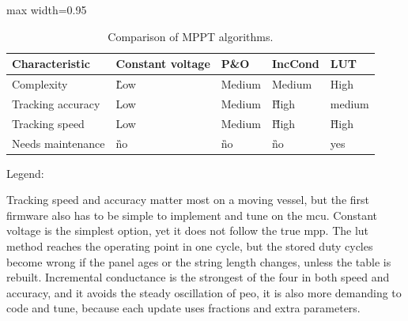         \begin{table}[htbp]
        \centering
        \caption{Comparison of MPPT algorithms.}
        \label{tab:mppt-algorithm-comparison}
        \scriptsize
        \setlength{\tabcolsep}{4pt}
        \renewcommand{\arraystretch}{1.05}
        \begin{adjustbox}{max width=0.95\textwidth}
            \begin{tabularx}{\textwidth}{>{\raggedright\arraybackslash}p{3.2cm}
                                        >{\centering\arraybackslash}X
                                        >{\centering\arraybackslash}X
                                        >{\centering\arraybackslash}X
                                        >{\centering\arraybackslash}X}
            \toprule
            \textbf{Characteristic} & \textbf{Constant voltage} & \textbf{P\&O} & \textbf{IncCond} & \textbf{LUT} \\
            \midrule
            Complexity & \G Low & \Y Medium & \Y Medium & \R High \\
            Tracking accuracy & \R Low & \Y Medium & \G High & \Y medium \\
            Tracking speed & \R Low & \Y Medium & \G High & \G High \\
            Needs maintenance & \G no & \G no & \G no & \R yes \\
            \bottomrule
            \end{tabularx}
        \end{adjustbox}
            \begin{center}
                Legend:   
            \end{center}
        \end{table}

        Tracking speed and accuracy matter most on a moving vessel, but the first firmware also has to be simple to implement and tune on the \ac{mcu}. Constant voltage is the simplest option, yet it does not follow the true \ac{mpp}. The \acs{lut} method reaches the operating point in one cycle, but the stored duty cycles become wrong if the panel ages or the string length changes, unless the table is rebuilt. Incremental conductance is the strongest of the four in both speed and accuracy, and it avoids the steady oscillation of \ac{peo}, it is also more demanding to code and tune, because each update uses fractions and extra parameters.

